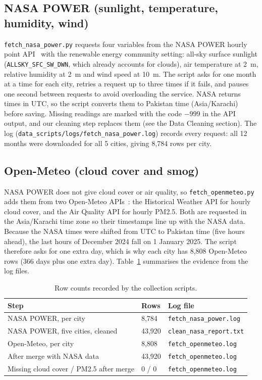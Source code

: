 \subsection{NASA POWER (sunlight, temperature, humidity, wind)}
\texttt{fetch\_nasa\_power.py} requests four variables from the NASA POWER hourly point API~\cite{nasapower} with the renewable energy community setting: all-sky surface sunlight (\texttt{ALLSKY\_SFC\_SW\_DWN}, which already accounts for clouds), air temperature at 2~m, relative humidity at 2~m and wind speed at 10~m. The script asks for one month at a time for each city, retries a request up to three times if it fails, and pauses one second between requests to avoid overloading the service. NASA returns times in UTC, so the script converts them to Pakistan time (Asia/Karachi) before saving. Missing readings are marked with the code $-999$ in the API output, and our cleaning step replaces them (see the Data Cleaning section). The log (\texttt{data\_scripts/logs/fetch\_nasa\_power.log}) records every request: all 12 months were downloaded for all 5 cities, giving 8{,}784 rows per city.

\subsection{Open-Meteo (cloud cover and smog)}
NASA POWER does not give cloud cover or air quality, so \texttt{fetch\_openmeteo.py} adds them from two Open-Meteo APIs~\cite{openmeteo}: the Historical Weather API for hourly cloud cover, and the Air Quality API for hourly PM2.5. Both are requested in the Asia/Karachi time zone so their timestamps line up with the NASA data. Because the NASA times were shifted from UTC to Pakistan time (five hours ahead), the last hours of December 2024 fall on 1 January 2025. The script therefore asks for one extra day, which is why each city has 8{,}808 Open-Meteo rows (366 days plus one extra day). Table~\ref{tab:evidence} summarises the evidence from the log files.

\begin{table}[H]
\centering
\small
\begin{tabular}{p{5.0cm} p{2.4cm} p{4.8cm}}
\toprule
\textbf{Step} & \textbf{Rows} & \textbf{Log file} \\
\midrule
NASA POWER, per city & 8{,}784 & \texttt{fetch\_nasa\_power.log} \\
NASA POWER, five cities, cleaned & 43{,}920 & \texttt{clean\_nasa\_report.txt} \\
Open-Meteo, per city & 8{,}808 & \texttt{fetch\_openmeteo.log} \\
After merge with NASA data & 43{,}920 & \texttt{fetch\_openmeteo.log} \\
Missing cloud cover / PM2.5 after merge & 0 / 0 & \texttt{fetch\_openmeteo.log} \\
\bottomrule
\end{tabular}
\caption{Row counts recorded by the collection scripts.}
\label{tab:evidence}
\end{table}

